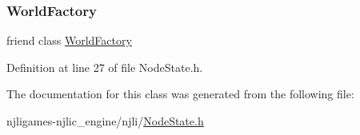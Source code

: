 \subsubsection{\texorpdfstring{World\+Factory}{WorldFactory}}
{\footnotesize\ttfamily friend class \mbox{\hyperlink{classnjli_1_1_world_factory}{World\+Factory}}\hspace{0.3cm}{\ttfamily [friend]}}



Definition at line 27 of file Node\+State.\+h.



The documentation for this class was generated from the following file\+:\begin{DoxyCompactItemize}
\item 
njligames-\/njlic\+\_\+engine/njli/\mbox{\hyperlink{_node_state_8h}{Node\+State.\+h}}\end{DoxyCompactItemize}
